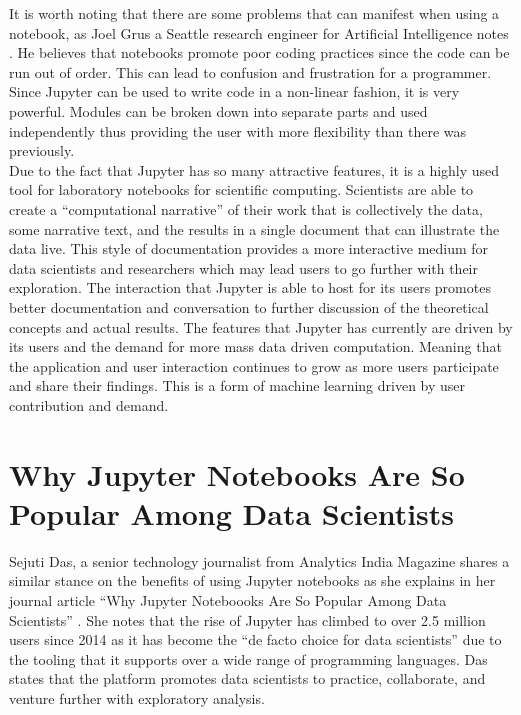 \documentclass[conference]{IEEEtran}
\begin{document}
It is worth noting that there are some problems that can manifest when using a notebook, as Joel Grus a Seattle research engineer for Artificial Intelligence notes \cite{b1}. He believes that notebooks promote poor coding practices since the code can be run out of order. This can lead to confusion and frustration for a programmer. Since Jupyter can be used to write code in a non-linear fashion, it is very powerful. Modules can be broken down into separate parts and used independently thus providing the user with more flexibility than there was previously. \\

Due to the fact that Jupyter has so many attractive features, it is a highly used tool for laboratory notebooks for scientific computing. Scientists are able to create a “computational narrative” of their work that is collectively the data, some narrative text, and the results in a single document that can illustrate the data live. This style of documentation provides a more interactive medium for data scientists and researchers which may lead users to go further with their exploration. The interaction that Jupyter is able to host for its users promotes better documentation and conversation to further discussion of the theoretical concepts and actual results. The features that Jupyter has currently are driven by its users and the demand for more mass data driven computation. Meaning that the application and user interaction continues to grow as more users participate and share their findings. This is a form of machine learning driven by user contribution and demand.\\

\section{Why Jupyter Notebooks Are So Popular Among Data Scientists}
Sejuti Das, a senior technology journalist from Analytics India Magazine shares a similar stance on the benefits of using Jupyter notebooks as she explains in her journal article “Why Jupyter Noteboooks Are So Popular Among Data Scientists” \cite{b2}. She notes that the rise of Jupyter has climbed to over 2.5 million users since 2014 as it has become the “de facto choice for data scientists” due to the tooling that it supports over a wide range of programming languages. Das states that the platform promotes data scientists to practice, collaborate, and venture further with exploratory analysis.\\
\end{document}
